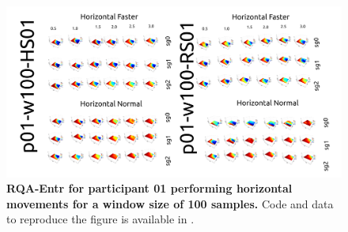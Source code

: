 \documentclass[12pt]{article}
\begin{document}

\newpage
\begin{figure}[ht!]
\centering
\includegraphics[scale=1.0]{figures/rqa/output/epsilons/rqa-epsilonsp01w100Horizontal}
    	\caption{
	{\bf RQA-Entr for participant 01 performing horizontal movements for a window size of 100 samples.}
	Code and data to reproduce the figure is available in \cite{srep2020}.
        }
    \label{fig-p01-H-w100}
\end{figure}
\end{document}

